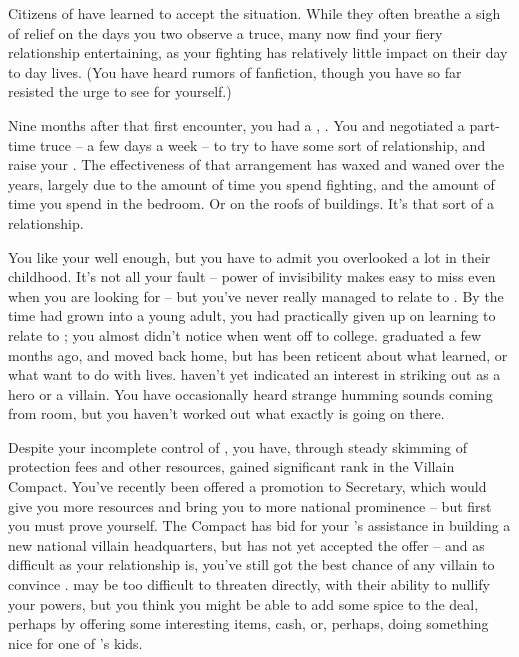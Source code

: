 \documentclass[char]{LRSguildcamp1}
\begin{document}
Citizens of \pCityO{} have learned to accept the situation. While they often breathe a sigh of relief on the days you two observe a truce, many now find your fiery relationship entertaining, as your fighting has relatively little impact on their day to day lives.  (You have heard rumors of fanfiction, though you have so far resisted the urge to see for yourself.)

Nine months after that first encounter, you had a \cGrad{\offspring}, \cGrad{\intro}.  
You and \cOS{} negotiated a part-time truce -- a few days a week -- to try to have some sort of relationship, and raise your \cGrad{\offspring}.  
The effectiveness of that arrangement has waxed and waned over the years, largely due to the amount of time you spend fighting, and the amount of time you spend in the bedroom.  
Or on the roofs of buildings.  
It's that sort of a relationship.  

You like your \cGrad{\offspring} well enough, but you have to admit you overlooked \cGrad{\them} a lot in their childhood.  
It's not all your fault -- \cGrad{\their} power of invisibility makes \cGrad{\them} easy to miss even when you are looking for \cGrad{\them} -- but you've never really managed to relate to \cGrad{\them}.  
By the time \cGrad{\they} had grown into a young adult, you had practically given up on learning to relate to \cGrad{\them}; you almost didn't notice when \cGrad{} went off to college.  
\cGrad{\They} graduated a few months ago, and moved back home, but has been reticent about what \cGrad{\they} learned, or what \cGrad{\they} want to do with \cGrad{\their} lives.  \cGrad{\They} haven't yet indicated an interest in striking out as a hero or a villain.  
You have occasionally heard strange humming sounds coming from \cGrad{\their} room, but you haven't worked out what exactly is going on there. %

Despite your incomplete control of \pCityO{}, you have, through steady skimming of protection fees and other resources, gained significant rank in the Villain Compact.  You've recently been offered a promotion to Secretary, which would give you more resources and bring you to more national prominence -- but first you must prove yourself.  The Compact has bid for your \cArchitect{\sibling} \cArchitect{}'s assistance in building a new national villain headquarters, but \cArchitect{} has not yet accepted the offer -- and as difficult as your relationship is, you've still got the best chance of any villain to convince \cArchitect{\them}.  \cArchitect{} may be too difficult to threaten directly, with their ability to nullify your powers, but you think you might be able to add some spice to the deal, perhaps by offering some interesting items, cash, or, perhaps, doing something nice for one of \cArchitect{}'s kids.  
\end{document}

